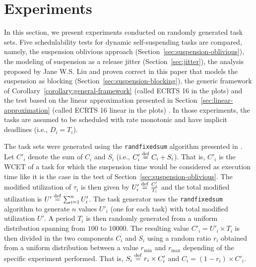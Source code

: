 \section{Experiments}
\label{sec:experiments}

In this section, we present experiments conducted on randomly generated task sets. Five schedulability tests for dynamic self-suspending tasks are compared, namely, the suspension oblivious approach (Section~\ref{sec:suspension-oblivious}), the modeling of suspension as a release jitter (Section~\ref{sec:jitter}), the analysis proposed by Jane W.S. Liu and proven correct in this paper that models the suspension as blocking (Section~\ref{sec:suspension-blocking}), the generic framework of Corollary~\ref{corollary:general-framework} (called ECRTS 16 in the plots) and the test based on the linear approximation presented in Section~\ref{sec:linear-approximation} (called ECRTS 16 linear in the plots) . In those experiments, the tasks are assumed to be scheduled with rate monotonic and have implicit deadlines (i.e., $D_i = T_i$).

The task sets were generated using the \texttt{randfixedsum} algorithm presented in \cite{Emberson-taskSetGeneration-2010}. Let $C'_i$ denote the sum of $C_i$ and $S_i$ (i.e., $C'_i \stackrel{\mathrm{def}}{=} C_i + S_i$). That is, $C'_i$ is the WCET of a task for which the suspension time would be considered as execution time like it is the case in the test of Section~\ref{sec:suspension-oblivious}. The modified utilization of $\tau_i$ is then given by $U'_i \stackrel{\mathrm{def}}{=} \frac{C'_i}{T_i}$ and the total modified utilization is $U' \stackrel{\mathrm{def}}{=} \sum_{i=1}^n U'_i$. The task generator uses the \texttt{randfixedsum} algorithm to generate $n$ values $U'_i$ (one for each task) with total modified utilization $U'$. A period $T_i$ is then randomly generated from a uniform distribution spanning from $100$ to $10000$. The resulting value $C'_i = U'_i \times T_i$ is then divided in the two components $C_i$ and $S_i$ using a random ratio $r_i$ obtained from a uniform distribution between a value $r_{\min}$ and $r_{\max}$ depending of the specific experiment performed. That is, $S_i \stackrel{\mathrm{def}}{=} r_i \times C'_i$ and $C_i = (1 - r_i) \times C'_i$. 

